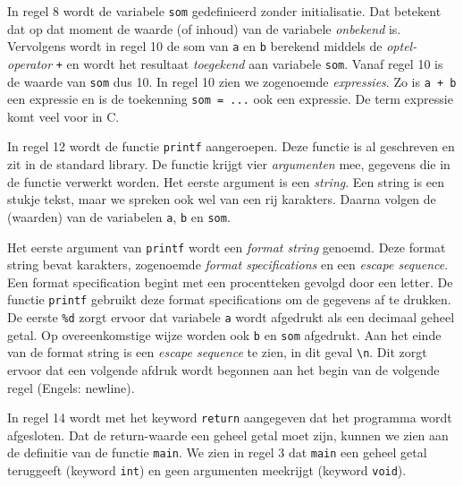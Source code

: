 
In regel 8 wordt de variabele \texttt{som} gedefinieerd zonder initialisatie. Dat betekent dat op dat moment de waarde (of inhoud) van de variabele \textsl{onbekend} is. Vervolgens wordt in regel 10 de som van \texttt{a} en \texttt{b} berekend middels de \textsl{optel-operator} \texttt{+} en wordt het resultaat \textsl{toegekend} aan variabele \texttt{som}. Vanaf regel 10 is de waarde van \texttt{som} dus 10. In regel 10 zien we zogenoemde \textsl{expressies}. Zo is \texttt{a + b} een expressie en is de toekenning \mbox{\texttt{som = ...}} ook een expressie. De term expressie komt veel voor in C.

In regel 12 wordt de functie \texttt{printf} aangeroepen. Deze functie is al geschreven en zit in de standard library. De functie krijgt vier \textsl{argumenten} mee, gegevens die in de functie verwerkt worden. Het eerste argument is een \textsl{string}. Een string is een stukje tekst, maar we spreken ook wel van een rij karakters. Daarna volgen de (waarden) van de variabelen \texttt{a}, \texttt{b} en \texttt{som}.

Het eerste argument van \texttt{printf} wordt een \textsl{format string} genoemd.
Deze format string bevat karakters, zogenoemde \textsl{format specifications} en een \textsl{escape sequence}. Een format specification begint met een procentteken gevolgd door een letter. De functie \texttt{printf} gebruikt deze format specifications om de gegevens af te drukken. De eerste \texttt{\%d} zorgt ervoor dat variabele \texttt{a} wordt afgedrukt als een decimaal geheel getal. Op overeenkomstige wijze worden ook \texttt{b} en \texttt{som} afgedrukt. Aan het einde van de format string is een \textsl{escape sequence} te zien, in dit geval \texttt{\textbackslash n}. Dit zorgt ervoor dat een volgende afdruk wordt begonnen aan het begin van de volgende regel (Engels: newline).

In regel 14 wordt met het keyword \texttt{return} aangegeven dat het programma wordt afgesloten. 
Dat de return-waarde een geheel getal moet zijn, kunnen we zien aan de definitie van de functie \texttt{main}. We zien in regel 3 dat \texttt{main} een geheel getal teruggeeft (keyword \texttt{int}) en geen argumenten meekrijgt (keyword \texttt{void}).

